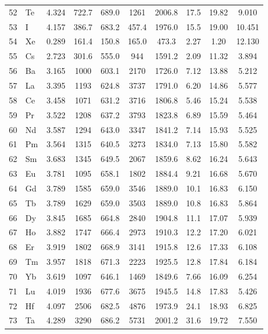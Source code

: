 \documentclass[11pt,a4paper]{article}
\begin{document}
\begin{english}
\begin{longtable}{@{}llcccccccc@{}}
			52 & Te  & 4.324 & 722.7  & 689.0  & 1261   & 2006.8 & 17.5  & 19.82 & 9.010 \\
			53 & I   & 4.157 & 386.7  & 683.2  & 457.4  & 1976.0 & 15.5  & 19.00 & 10.451 \\
			54 & Xe  & 0.289 & 161.4  & 150.8  & 165.0  & 473.3  & 2.27  & 1.20  & 12.130 \\
			55 & Cs  & 2.723 & 301.6  & 555.0  & 944    & 1591.2 & 2.09  & 11.32 & 3.894 \\
			56 & Ba  & 3.165 & 1000   & 603.1  & 2170   & 1726.0 & 7.12  & 13.88 & 5.212 \\
			57 & La  & 3.395 & 1193   & 624.8  & 3737   & 1791.0 & 6.20  & 14.86 & 5.577 \\
			58 & Ce  & 3.458 & 1071   & 631.2  & 3716   & 1806.8 & 5.46  & 15.24 & 5.538 \\
			59 & Pr  & 3.522 & 1208   & 637.2  & 3793   & 1823.8 & 6.89  & 15.59 & 5.464 \\
			60 & Nd  & 3.587 & 1294   & 643.0  & 3347   & 1841.2 & 7.14  & 15.93 & 5.525 \\
			61 & Pm  & 3.564 & 1315   & 640.5  & 3273   & 1834.0 & 7.13  & 15.80 & 5.582 \\
			62 & Sm  & 3.683 & 1345   & 649.5  & 2067   & 1859.6 & 8.62  & 16.24 & 5.643 \\
			63 & Eu  & 3.781 & 1095   & 658.1  & 1802   & 1884.4 & 9.21  & 16.68 & 5.670 \\
			64 & Gd  & 3.789 & 1585   & 659.0  & 3546   & 1889.0 & 10.1  & 16.83 & 6.150 \\
			65 & Tb  & 3.789 & 1629   & 659.0  & 3503   & 1889.0 & 10.8  & 16.83 & 5.864 \\
			66 & Dy  & 3.845 & 1685   & 664.8  & 2840   & 1904.8 & 11.1  & 17.07 & 5.939 \\
			67 & Ho  & 3.882 & 1747   & 666.4  & 2973   & 1910.3 & 12.2  & 17.20 & 6.021 \\
			68 & Er  & 3.919 & 1802   & 668.9  & 3141   & 1915.8 & 12.6  & 17.33 & 6.108 \\
			69 & Tm  & 3.957 & 1818   & 671.3  & 2223   & 1925.5 & 12.8  & 17.84 & 6.184 \\
			70 & Yb  & 3.619 & 1097   & 646.1  & 1469   & 1849.6 & 7.66  & 16.09 & 6.254 \\
			71 & Lu  & 4.019 & 1936   & 677.6  & 3675   & 1945.5 & 14.8  & 17.83 & 5.426 \\
			72 & Hf  & 4.097 & 2506   & 682.5  & 4876   & 1973.9 & 24.1  & 18.93 & 6.825 \\
			73 & Ta  & 4.289 & 3290   & 686.2  & 5731   & 2001.2 & 31.6  & 19.72 & 7.550 \\

\end{longtable}
\end{english}
\end{document}
